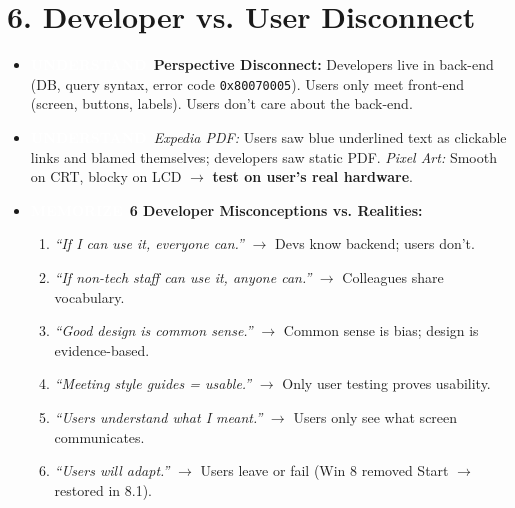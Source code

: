 \documentclass[8.5pt,a4paper,twocolumn]{article}
\newcommand{\tagmem}{\colorbox{accentred}{\textcolor{white}{\bfseries\fontsize{5.5pt}{6.5pt}\selectfont MEMORIZE}}\ }
\newcommand{\tagund}{\colorbox{themeblue}{\textcolor{white}{\bfseries\fontsize{5.5pt}{6.5pt}\selectfont UNDERSTAND}}\ }
\begin{document}
\section*{6. Developer vs. User Disconnect}
\begin{itemize}[leftmargin=7pt, itemsep=1pt, topsep=0.5pt]
    \item \tagund \textbf{Perspective Disconnect:} Developers live in back-end (DB, query syntax, error code \texttt{0x80070005}). Users only meet front-end (screen, buttons, labels). Users don't care about the back-end.
    \item \tagund \textit{Expedia PDF:} Users saw blue underlined text as clickable links and blamed themselves; developers saw static PDF. \textit{Pixel Art:} Smooth on CRT, blocky on LCD $\rightarrow$ \textbf{test on user's real hardware}.
    \item \tagmem \textbf{6 Developer Misconceptions vs. Realities:}
    \begin{enumerate}[leftmargin=8pt, itemsep=0.5pt]
        \item \textit{``If I can use it, everyone can.''} $\rightarrow$ Devs know backend; users don't.
        \item \textit{``If non-tech staff can use it, anyone can.''} $\rightarrow$ Colleagues share vocabulary.
        \item \textit{``Good design is common sense.''} $\rightarrow$ Common sense is bias; design is evidence-based.
        \item \textit{``Meeting style guides = usable.''} $\rightarrow$ Only user testing proves usability.
        \item \textit{``Users understand what I meant.''} $\rightarrow$ Users only see what screen communicates.
        \item \textit{``Users will adapt.''} $\rightarrow$ Users leave or fail (Win 8 removed Start $\rightarrow$ restored in 8.1).
    \end{enumerate}
\end{itemize}
\end{document}

